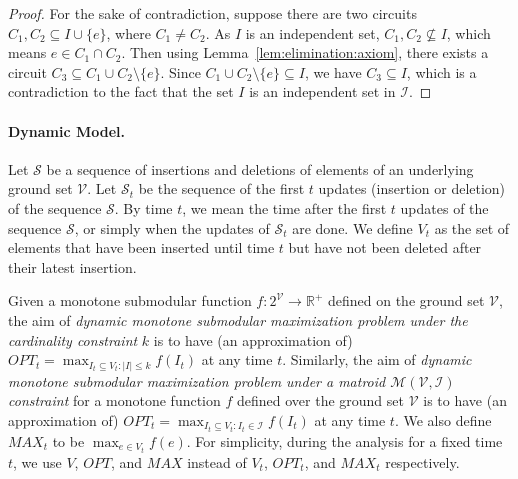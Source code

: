 \documentclass[11pt]{article}
\newcommand{\REAL}{\ensuremath{\mathbb{R}}}
\newcommand{\matroid}{\mathcal{M}(\ground,\mathcal{I})}
\newcommand{\ground}{\ensuremath{\mathcal{V}}}
\begin{document}
\begin{proof}
For the sake of contradiction, suppose there are two circuits $C_1, C_2 \subseteq I \cup \{e\}$, where $C_1 \neq C_2$. 
As $I$ is an independent set, $C_1, C_2 \nsubseteq I$, which means $e \in C_1 \cap C_2$. 
Then using Lemma~\ref{lem:elimination:axiom}, there exists a circuit $C_3 \subseteq C_1 \cup C_2 \setminus \{e\}$. Since $C_1 \cup C_2 \setminus \{e\} \subseteq I$, 
we have $C_3 \subseteq I$, which is a contradiction to the fact that the set $I$ is an independent set in $\mathcal{I}$. 
\end{proof}




\paragraph{Dynamic Model.}
Let $\mathcal{S}$ be a sequence of insertions and deletions of elements of an underlying ground set $\ground$.
Let $\mathcal{S}_t$ be the sequence of the first $t$ updates (insertion or deletion) of the sequence $\mathcal{S}$.
By time $t$, we mean the time after the first $t$ updates of the sequence $\mathcal{S}$, or simply when the updates of $\mathcal{S}_t$ are done. 
We define $V_t$ as the set of elements that have been inserted until time $t$ but have not been deleted after their latest insertion. 

Given a monotone submodular function  $f: 2^{\ground} \rightarrow \REAL^+$ defined on the ground set $\ground$, the aim of \emph{dynamic monotone submodular maximization problem under the cardinality constraint} $k$ is to have (an approximation of) $OPT_t = \max_{I_t \subseteq V_t: |I| \le k} f(I_t)$ at any time $t$. Similarly, the aim of \emph{dynamic monotone submodular maximization problem under a matroid $\matroid$ constraint} for a monotone function $f$ defined over the ground set $\ground$ is to have (an approximation of) $OPT_t=\max_{I_t \subseteq V_t: I_t\in \mathcal{I}}  f(I_t)$ at any time $t$. We also define $MAX_t$ to be $\max_{e \in V_t} f(e)$.
For simplicity, during the analysis for a fixed time $t$, we use $V$, $OPT$, and $MAX$ instead of $V_t$, $OPT_t$, and $MAX_t$ respectively.
\end{document}
